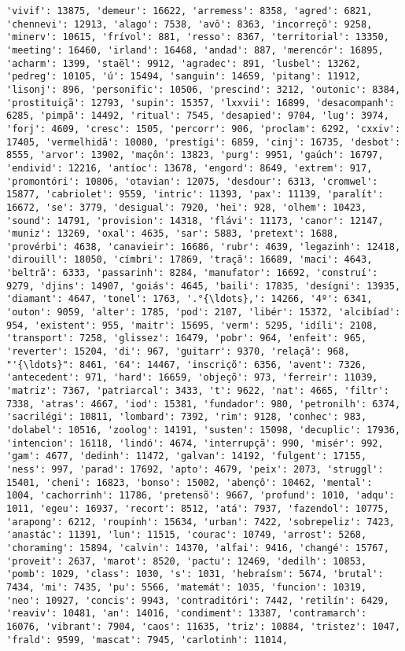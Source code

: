 \begin{Verbatim}[commandchars=\\\{\}]
'vivif': 13875, 'demeur': 16622, 'arremess': 8358, 'agred': 6821, 'chennevi': 12913, 'alago': 7538, 'avô': 8363, 'incorreçõ': 9258, 'minerv': 10615, 'frívol': 881, 'resso': 8367, 'territorial': 13350, 'meeting': 16460, 'irland': 16468, 'andad': 887, 'merencór': 16895, 'acharm': 1399, 'staël': 9912, 'agradec': 891, 'lusbel': 13262, 'pedreg': 10105, 'ú': 15494, 'sanguin': 14659, 'pitang': 11912, 'lisonj': 896, 'personific': 10506, 'prescind': 3212, 'outonic': 8384, 'prostituiçã': 12793, 'supin': 15357, 'lxxvii': 16899, 'desacompanh': 6285, 'pimpã': 14492, 'ritual': 7545, 'desapied': 9704, 'lug': 3974, 'forj': 4609, 'cresc': 1505, 'percorr': 906, 'proclam': 6292, 'cxxiv': 17405, 'vermelhidã': 10080, 'prestígi': 6859, 'cinj': 16735, 'desbot': 8555, 'arvor': 13902, 'maçôn': 13823, 'purg': 9951, 'gaúch': 16797, 'endivid': 12216, 'antíoc': 13678, 'engord': 8649, 'extrem': 917, 'promontóri': 10806, 'otavian': 12075, 'desdour': 6313, 'cromwel': 15877, 'cabriolet': 9559, 'intric': 11393, 'pax': 11139, 'paralít': 16672, 'se': 3779, 'desigual': 7920, 'hei': 928, 'olhem': 10423, 'sound': 14791, 'provision': 14318, 'flávi': 11173, 'canor': 12147, 'muniz': 13269, 'oxal': 4635, 'sar': 5883, 'pretext': 1688, 'provérbi': 4638, 'canavieir': 16686, 'rubr': 4639, 'legazinh': 12418, 'dirouill': 18050, 'címbri': 17869, 'traçã': 16689, 'maci': 4643, 'beltrã': 6333, 'passarinh': 8284, 'manufator': 16692, 'construí': 9279, 'djins': 14907, 'goiás': 4645, 'baili': 17835, 'desígni': 13935, 'diamant': 4647, 'tonel': 1763, '.°{\ldots},': 14266, '4º': 6341, 'outon': 9059, 'alter': 1785, 'pod': 2107, 'libér': 15372, 'alcibíad': 954, 'existent': 955, 'maitr': 15695, 'verm': 5295, 'idíli': 2108, 'transport': 7258, 'glissez': 16479, 'pobr': 964, 'enfeit': 965, 'reverter': 15204, 'di': 967, 'guitarr': 9370, 'relaçã': 968, "'{\ldots}": 8461, '64': 14467, 'inscriçõ': 6356, 'avent': 7326, 'antecedent': 971, 'hard': 16659, 'objeçõ': 973, 'ferreir': 11039, 'matriz': 7367, 'patriarcal': 3433, 't': 9622, 'nat': 4665, 'filtr': 7338, 'atras': 4667, 'iod': 15381, 'fundador': 980, 'petronilh': 6374, 'sacrilégi': 10811, 'lombard': 7392, 'rim': 9128, 'conhec': 983, 'dolabel': 10516, 'zoolog': 14191, 'susten': 15098, 'decuplic': 17936, 'intencion': 16118, 'lindó': 4674, 'interrupçã': 990, 'misér': 992, 'gam': 4677, 'dedinh': 11472, 'galvan': 14192, 'fulgent': 17155, 'ness': 997, 'parad': 17692, 'apto': 4679, 'peix': 2073, 'struggl': 15401, 'cheni': 16823, 'bonso': 15002, 'abençô': 10462, 'mental': 1004, 'cachorrinh': 11786, 'pretensõ': 9667, 'profund': 1010, 'adqu': 1011, 'egeu': 16937, 'recort': 8512, 'atá': 7937, 'fazendol': 10775, 'arapong': 6212, 'roupinh': 15634, 'urban': 7422, 'sobrepeliz': 7423, 'anastác': 11391, 'lun': 11515, 'courac': 10749, 'arrost': 5268, 'choraming': 15894, 'calvin': 14370, 'alfai': 9416, 'changé': 15767, 'proveit': 2637, 'marot': 8520, 'pactu': 12469, 'dedilh': 10853, 'pomb': 1029, 'class': 1030, 's': 1031, 'hebraísm': 5674, 'brutal': 7434, 'mi': 7435, 'pu': 5566, 'matemát': 1035, 'funcion': 10319, 'neo': 10927, 'concis': 9943, 'contraditóri': 7442, 'retilín': 6429, 'reaviv': 10481, 'an': 14016, 'condiment': 13387, 'contramarch': 16076, 'vibrant': 7904, 'caos': 11635, 'triz': 10884, 'tristez': 1047, 'frald': 9599, 'mascat': 7945, 'carlotinh': 11014, 
\end{Verbatim}
